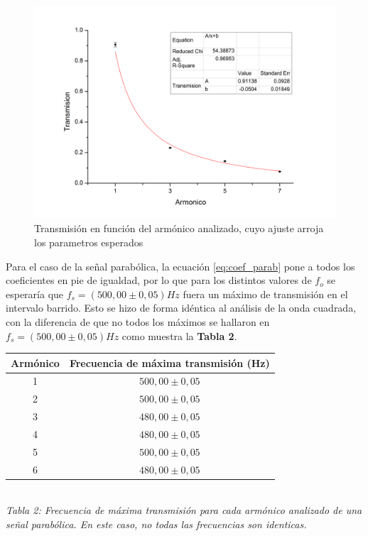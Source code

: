 \documentclass[11pt,a4paper]{article}
\begin{document}
\begin{figure}[h]
\centering
\includegraphics[scale=0.6]{Trans_vs_Arm_Cuad}
\caption{Transmisión en función del armónico analizado, cuyo ajuste arroja los parametros esperados}
\label{fig:transcuad}
\end{figure}

Para el caso de la señal parabólica, la ecuación \eqref{eq:coef_parab} pone a todos los coeficientes en pie de igualdad, por lo que para los distintos valores de $f_o$ se esperaría que $f_s = (500,00 \pm 0,05)Hz$ fuera un máximo de transmisión en el intervalo barrido. Esto se hizo de forma idéntica al análisis de la onda cuadrada, con la diferencia de que no todos los máximos se hallaron en $f_s = (500,00 \pm 0,05)Hz$ como muestra la \textbf{Tabla 2}.

\begin{center}
\begin{tabular}{||c|c||}
\hline 
\textbf{Armónico} & \textbf{Frecuencia de máxima transmisión (Hz)} \\ \hline 
 1 & $500,00 \pm 0,05$ \\ \hline 
 2 & $500,00 \pm 0,05$ \\ \hline 
 3 & $480,00 \pm 0,05$ \\ \hline 
 4 & $480,00 \pm 0,05$ \\ \hline 
 5 & $500,00 \pm 0,05$ \\ \hline 
 6 & $480,00 \pm 0,05$ \\ \hline 
\end{tabular}\\[0.3cm]
\textit{Tabla 2: Frecuencia de máxima transmisión para cada armónico analizado de una señal parabólica. En este caso, no todas las frecuencias son identicas.}
\end{center}
\end{document}

